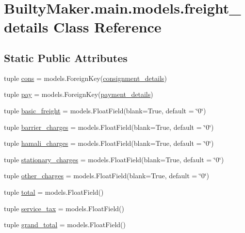 \hypertarget{classBuiltyMaker_1_1main_1_1models_1_1freight__details}{\section{\-Builty\-Maker.\-main.\-models.\-freight\-\_\-details \-Class \-Reference}
\label{classBuiltyMaker_1_1main_1_1models_1_1freight__details}
}
\subsection*{\-Static \-Public \-Attributes}
\begin{DoxyCompactItemize}
\item 
tuple \hyperlink{classBuiltyMaker_1_1main_1_1models_1_1freight__details_a78f12f414367eb324de4575ab3c3b436}{cons} = models.\-Foreign\-Key(\hyperlink{classBuiltyMaker_1_1main_1_1models_1_1consignment__details}{consignment\-\_\-details})
\item 
tuple \hyperlink{classBuiltyMaker_1_1main_1_1models_1_1freight__details_ae689ac649f8e8531feb16b2b94f5d3a1}{pay} = models.\-Foreign\-Key(\hyperlink{classBuiltyMaker_1_1main_1_1models_1_1payment__details}{payment\-\_\-details})
\item 
tuple \hyperlink{classBuiltyMaker_1_1main_1_1models_1_1freight__details_a542cdad1748fc5c52f3a94d6ec1421ef}{basic\-\_\-freight} = models.\-Float\-Field(blank=\-True, default = \char`\"{}0\char`\"{})
\item 
tuple \hyperlink{classBuiltyMaker_1_1main_1_1models_1_1freight__details_a70c3d45d6dccd59af7622238f6ffb357}{barrier\-\_\-charges} = models.\-Float\-Field(blank=\-True, default = \char`\"{}0\char`\"{})
\item 
tuple \hyperlink{classBuiltyMaker_1_1main_1_1models_1_1freight__details_a3f5b570b4f3d9614fe3d47978d0a097e}{hamali\-\_\-charges} = models.\-Float\-Field(blank=\-True, default = \char`\"{}0\char`\"{})
\item 
tuple \hyperlink{classBuiltyMaker_1_1main_1_1models_1_1freight__details_a653f7f79d75ad62d9ddedf7fc2311aa8}{stationary\-\_\-charges} = models.\-Float\-Field(blank=\-True, default = \char`\"{}0\char`\"{})
\item 
tuple \hyperlink{classBuiltyMaker_1_1main_1_1models_1_1freight__details_a5b9fa8dd23def7cf7356af4e17caafd7}{other\-\_\-charges} = models.\-Float\-Field(blank=\-True, default = \char`\"{}0\char`\"{})
\item 
tuple \hyperlink{classBuiltyMaker_1_1main_1_1models_1_1freight__details_a49f778391bbd1930168549bc66befc7c}{total} = models.\-Float\-Field()
\item 
tuple \hyperlink{classBuiltyMaker_1_1main_1_1models_1_1freight__details_a7f9af78a5d9cc0e4ebfe792a612a349a}{service\-\_\-tax} = models.\-Float\-Field()
\item 
tuple \hyperlink{classBuiltyMaker_1_1main_1_1models_1_1freight__details_a43110af05160e574cb628342e3b0f133}{grand\-\_\-total} = models.\-Float\-Field()
\end{DoxyCompactItemize}


